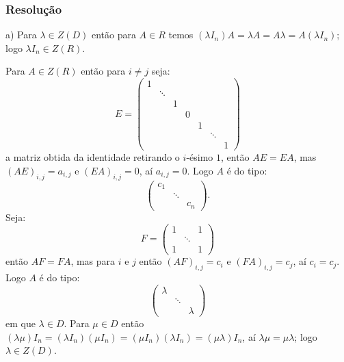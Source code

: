 \documentclass[10pt,a4paper]{article}
\begin{document}
\subsubsection*{Resolução}

a) Para $\lambda\in Z(D)$ então para $A\in R$ temos $(\lambda I_n)A=\lambda A=A\lambda=A(\lambda I_n)$; logo $\lambda I_n\in Z(R)$.

\medskip
\noindent
Para $A\in Z(R)$ então para $i\neq j$ seja:
\[
E=\begin{pmatrix}
1&&&&&&\\&\ddots&&&&&\\&&1&&&&\\&&&0&&&\\&&&&1&&\\&&&&&\ddots&\\&&&&&&1
\end{pmatrix}
\]
a matriz obtida da identidade retirando o $i$-ésimo $1$, então $AE=EA$, mas $(AE)_{i,j}=a_{i,j}$ e $(EA)_{i,j}=0$, aí $a_{i,j}=0$. Logo $A$ é do tipo:
\[
\begin{pmatrix}
c_1&&\\&\ddots&\\&&c_n
\end{pmatrix}.
\]
Seja:
\[
F=\begin{pmatrix}
1&&1\\&\ddots&\\1&&1
\end{pmatrix}
\]
então $AF=FA$, mas para $i$ e $j$ então $(AF)_{i,j}=c_i$ e $(FA)_{i,j}=c_j$, aí $c_i=c_j$. Logo $A$ é do tipo:
\[
\begin{pmatrix}
\lambda&&\\&\ddots&\\&&\lambda
\end{pmatrix}
\]
em que $\lambda\in D$. Para $\mu\in D$ então $(\lambda\mu)I_n=(\lambda I_n)(\mu I_n)=(\mu I_n)(\lambda I_n)=(\mu\lambda)I_n$, aí $\lambda\mu=\mu\lambda$; logo $\lambda\in Z(D)$.
\end{document}
